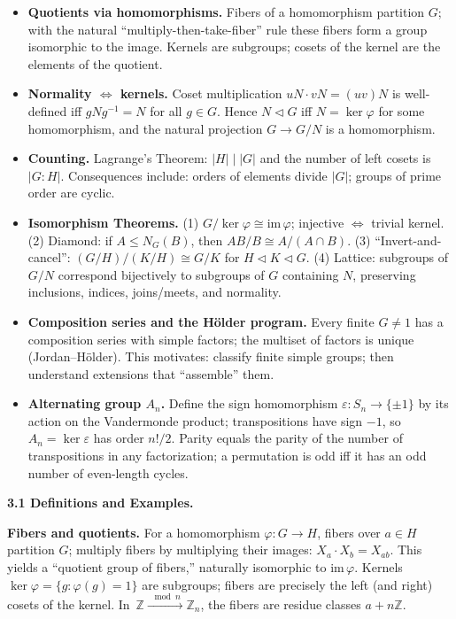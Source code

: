 \documentclass[12pt]{article}
\theoremstyle{definition}
\begin{document}
\begin{itemize}\itemsep4pt
\item \textbf{Quotients via homomorphisms.} Fibers of a homomorphism partition $G$; with the natural “multiply-then-take-fiber” rule these fibers form a group isomorphic to the image. Kernels are subgroups; cosets of the kernel are the elements of the quotient.
\item \textbf{Normality $\Longleftrightarrow$ kernels.} Coset multiplication $uN\cdot vN=(uv)N$ is well-defined iff $gNg^{-1}=N$ for all $g\in G$. Hence $N\lhd G$ iff $N=\ker\varphi$ for some homomorphism, and the natural projection $G\to G/N$ is a homomorphism.
\item \textbf{Counting.} Lagrange’s Theorem: $|H|\mid |G|$ and the number of left cosets is $|G:H|$. Consequences include: orders of elements divide $|G|$; groups of prime order are cyclic.
\item \textbf{Isomorphism Theorems.} (1) $G/\ker\varphi\cong \mathrm{im}\,\varphi$; injective $\Leftrightarrow$ trivial kernel. (2) Diamond: if $A\le N_G(B)$, then $AB/B\cong A/(A\cap B)$. (3) “Invert-and-cancel”: $(G/H)/(K/H)\cong G/K$ for $H\lhd K\lhd G$. (4) Lattice: subgroups of $G/N$ correspond bijectively to subgroups of $G$ containing $N$, preserving inclusions, indices, joins/meets, and normality.
\item \textbf{Composition series and the Hölder program.} Every finite $G\neq 1$ has a composition series with simple factors; the multiset of factors is unique (Jordan–Hölder). This motivates: classify finite simple groups; then understand extensions that “assemble” them.
\item \textbf{Alternating group $A_n$.} Define the sign homomorphism $\varepsilon:S_n\to\{\pm1\}$ by its action on the Vandermonde product; transpositions have sign $-1$, so $A_n=\ker\varepsilon$ has order $n!/2$. Parity equals the parity of the number of transpositions in any factorization; a permutation is odd iff it has an odd number of even-length cycles.
\end{itemize}

\newpage

\textbf{3.1 Definitions and Examples.}

\newpage

\medskip
\textbf{Fibers and quotients.} For a homomorphism $\varphi:G\to H$, fibers over $a\in H$ partition $G$; multiply fibers by multiplying their images: $X_a\cdot X_b=X_{ab}$. This yields a “quotient group of fibers,” naturally isomorphic to $\mathrm{im}\,\varphi$. Kernels $\ker\varphi=\{g:\varphi(g)=1\}$ are subgroups; fibers are precisely the left (and right) cosets of the kernel. In $\,\mathbb{Z}\xrightarrow{\;\bmod n\;}\mathbb{Z}_n$, the fibers are residue classes $a+n\mathbb{Z}$. 
\end{document}
